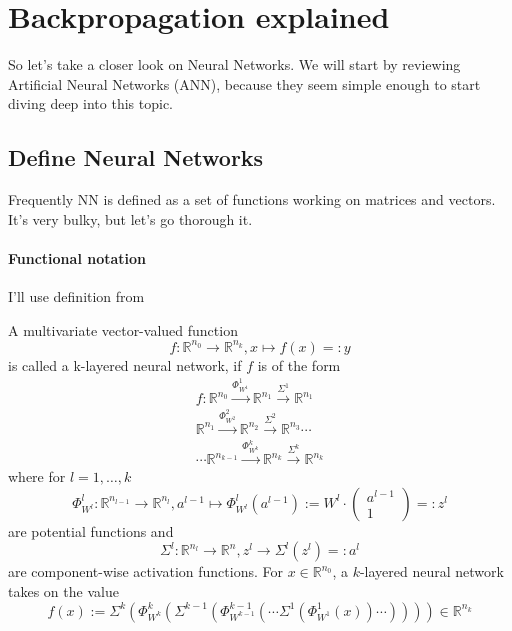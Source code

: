 \documentclass[draft]{article}
\def\RealSet{\mathbb{R}}
\begin{document}
\section{Backpropagation explained}


So let's take a closer look on Neural Networks. We will start by reviewing Artificial Neural Networks (ANN), because they seem simple enough to start diving deep into this topic.


\subsection{Define Neural Networks}

Frequently NN is defined as a set of functions working on matrices and vectors. It's very bulky, but let's go thorough it. 

\paragraph{Functional notation}
I'll use definition from \cite{Ostwald:2021}

A multivariate vector-valued function
\[
f \colon \RealSet^{n_0} \rightarrow \RealSet^{n_k}, x\mapsto f(x)=:y
\]
is called a k-layered neural network, if $f$ is of the form
\begin{multline}
f \colon \RealSet^{n_0} \xrightarrow{\Phi_{W^1}^1} \RealSet^{n_1}
\xrightarrow{\Sigma^1} \RealSet^{n_1} \\
\RealSet^{n_1} \xrightarrow{\Phi_{W^2}^2} \RealSet^{n_2}
\xrightarrow{\Sigma^2} \RealSet^{n_3} \cdots \\
\cdots \RealSet^{n_{k-1}}
\xrightarrow{\Phi_{W^k}^k} \RealSet^{n_k}
\xrightarrow{\Sigma^k} \RealSet^{n_k}
\end{multline}
where for $l=1,\ldots,k$
\begin{equation}\label{Phi}
\Phi_{W^l}^l \colon \RealSet^{n_{l-1}} \rightarrow \RealSet^{n_l}, 
a^{l-1}\mapsto \Phi_{W^l}^l(a^{l-1}) :=W^l \cdot \begin{pmatrix} a^{l-1} \\ 1 \end{pmatrix} =: z^l
\end{equation}
are potential functions and
\begin{equation}\label{Sigma}
\Sigma^l \colon \RealSet^{n_{l}} \rightarrow \RealSet^{n},
z^l \rightarrow \Sigma^l(z^l) =: a^l
\end{equation}
are component-wise activation functions. For $x\in \RealSet^{n_0}$, a $k$-layered neural network takes on the value
\[
f(x) := \Sigma^k( \Phi_{W^k}^k( \Sigma^{k-1}( \Phi_{W^{k-1}}^{k-1}(\cdots \Sigma^1( \Phi_{W^1}^1(x) ) \cdots) ) ) ) \in \RealSet^{n_k}
\]
\end{document}
